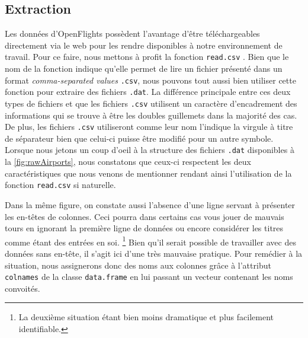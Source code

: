 \subsection{Extraction}

\label{subsec:extraction}
Les données d'OpenFlights possèdent l'avantage d'être téléchargeables directement via le web pour les rendre disponibles à notre environnement de travail. Pour ce faire, nous mettons à profit la fonction \texttt{read.csv} \cite{Rfunction:read.csv}. Bien que le nom de la fonction indique qu'elle permet de lire un fichier présenté dans un format \emph{comma-separated values} \texttt{.csv}, nous pouvons tout aussi bien utiliser cette fonction pour extraire des fichiers \texttt{.dat}. La différence principale entre ces deux types de fichiers et que les fichiers \texttt{.csv} utilisent un caractère d'encadrement des informations qui se trouve à être les doubles guillemets dans la majorité des cas. De plus, les fichiers \texttt{.csv} utiliseront comme leur nom l'indique la virgule à titre de séparateur bien que celui-ci puisse être modifié pour un autre symbole.\cite{CSVDAT} Lorsque nous jetons un coup d'oeil à la structure des fichiers \texttt{.dat} disponibles à la \autoref{fig:rawAirports}, nous constatons que ceux-ci respectent les deux caractéristiques que nous venons de mentionner rendant ainsi l'utilisation de la fonction \texttt{read.csv} si naturelle. \\


Dans la même figure, on constate aussi l'absence d'une ligne servant à présenter les en-têtes de colonnes. Ceci pourra dans certains cas vous jouer de mauvais tours en ignorant la première ligne de données ou encore considérer les titres comme étant des entrées en soi. \footnote{La deuxième situation étant bien moins dramatique et plus facilement identifiable.}  Bien qu'il serait possible de travailler avec des données sans en-tête, il s'agit ici d'une très mauvaise pratique. Pour remédier à la situation, nous assignerons donc des noms aux colonnes grâce à l'attribut \texttt{colnames} de la classe \texttt{data.frame} en lui passant un vecteur contenant les noms convoités. \\

